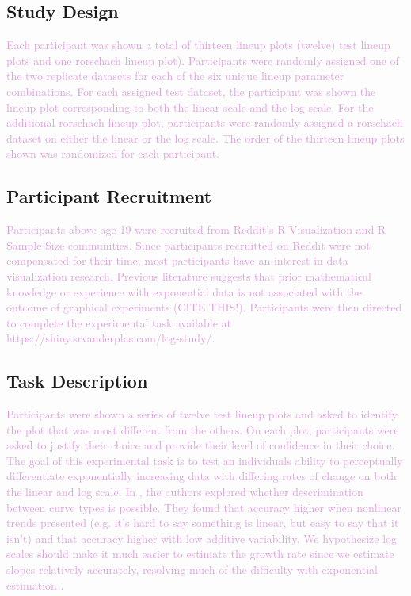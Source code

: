 \documentclass[]{interact}
\theoremstyle{plain}%
\theoremstyle{definition}
\theoremstyle{remark}
\begin{document}
\hypertarget{study-design}{%
\subsection{Study Design}\label{study-design}}

\textcolor{Plum}{
Each participant was shown a total of thirteen lineup plots (twelve) test lineup plots and one rorschach lineup plot). Participants were randomly assigned one of the two replicate datasets for each of the six unique lineup parameter combinations. For each assigned test dataset, the participant was shown the lineup plot corresponding to both the linear scale and the log scale. For the additional rorschach lineup plot, participants were randomly assigned a rorschach dataset on either the linear or the log scale. The order of the thirteen lineup plots shown was randomized for each participant. 
}

\hypertarget{participant-recruitment}{%
\subsection{Participant Recruitment}\label{participant-recruitment}}

\textcolor{Plum}{Participants above age 19 were recruited from Reddit's R Visualization and R Sample Size communities. 
Since participants recruitted on Reddit were not compensated for their time, most participants have an interest in data visualization research. 
Previous literature suggests that prior mathematical knowledge or experience with exponential data is not associated with the outcome of graphical experiments (CITE THIS!). 
Participants were then directed to complete the experimental task available at https://shiny.srvanderplas.com/log-study/.
}

\hypertarget{task-description}{%
\subsection{Task Description}\label{task-description}}

\textcolor{Plum}{Participants were shown a series of twelve test lineup plots and asked to identify the plot that was most different from the others. 
On each plot, participants were asked to justify their choice and provide their level of confidence in their choice.
The goal of this experimental task is to test an individuals ability to perceptually differentiate exponentially increasing data with differing rates of change on both the linear and log scale. 
In \cite{best_perception_2007}, the authors explored whether descrimination between curve types is possible. 
They found that accuracy higher when nonlinear trends presented (e.g. it’s hard to say something is linear, but easy to say that it isn’t) and that accuracy higher with low additive variability. We hypothesize log scales should make it much easier to estimate the growth rate since we estimate slopes relatively accurately, resolving much of the difficulty with exponential estimation \citep{mosteller_eye_1981}.
}
\end{document}
